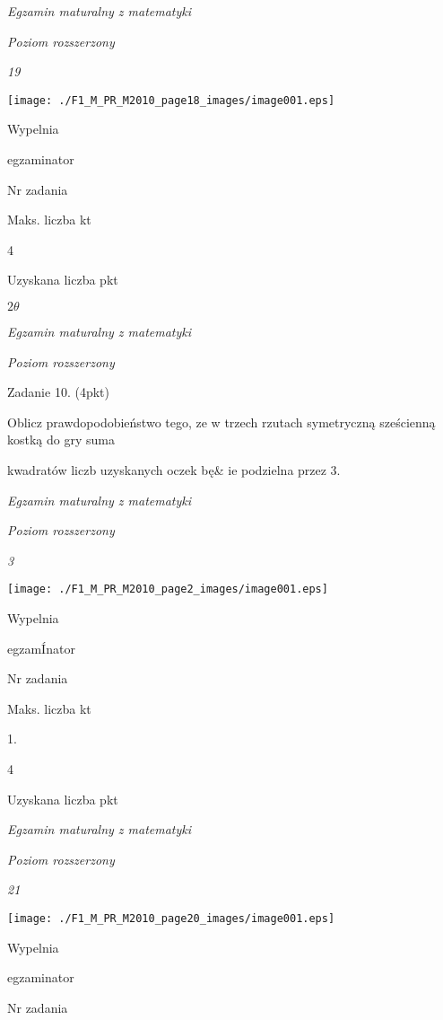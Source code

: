\documentclass[a4paper,12pt]{article}
\begin{document}
{\it Egzamin maturalny z matematyki}

{\it Poziom rozszerzony}

{\it 19}
\begin{center}
\texttt{[image: ./F1\_M\_PR\_M2010\_page18\_images/image001.eps]}
\end{center}
Wypelnia

egzaminator

Nr zadania

Maks. liczba kt

4

Uzyskana liczba pkt





$ 2\theta$

{\it Egzamin maturalny z matematyki}

{\it Poziom rozszerzony}

Zadanie 10. (4pkt)

Oblicz prawdopodobieństwo tego, ze w trzech rzutach symetryczną sześcienną kostką do gry suma

kwadratów liczb uzyskanych oczek bę\& ie podzielna przez 3.





{\it Egzamin maturalny z matematyki}

{\it Poziom rozszerzony}

{\it 3}
\begin{center}
\texttt{[image: ./F1\_M\_PR\_M2010\_page2\_images/image001.eps]}
\end{center}
Wypelnia

egzamÍnator

Nr zadania

Maks. liczba kt

1.

4

Uzyskana liczba pkt





{\it Egzamin maturalny z matematyki}

{\it Poziom rozszerzony}

{\it 21}
\begin{center}
\texttt{[image: ./F1\_M\_PR\_M2010\_page20\_images/image001.eps]}
\end{center}
Wypelnia

egzaminator

Nr zadania
\end{document}
